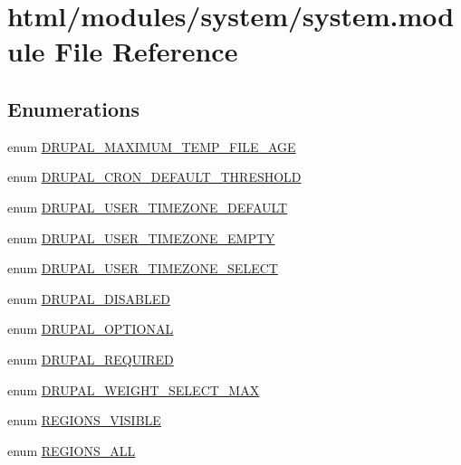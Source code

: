 \hypertarget{system_8module}{
\section{html/modules/system/system.module File Reference}
\label{system_8module}
}
\subsection*{Enumerations}
\begin{DoxyCompactItemize}
\item 
enum \hyperlink{system_8module_a48adbc5ce9391dacebddd91907dbbaaf}{DRUPAL\_\-MAXIMUM\_\-TEMP\_\-FILE\_\-AGE} 
\item 
enum \hyperlink{system_8module_a47326c184056858c75265eb78fea8eef}{DRUPAL\_\-CRON\_\-DEFAULT\_\-THRESHOLD} 
\item 
enum \hyperlink{system_8module_aabf97d0cd9173075e9d66e1acb2a6b7f}{DRUPAL\_\-USER\_\-TIMEZONE\_\-DEFAULT} 
\item 
enum \hyperlink{system_8module_a36f2231e8e443e860d5c67782a472542}{DRUPAL\_\-USER\_\-TIMEZONE\_\-EMPTY} 
\item 
enum \hyperlink{system_8module_a7df7638d437b7a705dfdb48f46b083e2}{DRUPAL\_\-USER\_\-TIMEZONE\_\-SELECT} 
\item 
enum \hyperlink{system_8module_a84956e394d850e59a82fbc78703795f1}{DRUPAL\_\-DISABLED} 
\item 
enum \hyperlink{system_8module_a1a7cc24228e990770cd55d79ba00e95e}{DRUPAL\_\-OPTIONAL} 
\item 
enum \hyperlink{system_8module_a0803ed1ab561db08e075e74427ecedd5}{DRUPAL\_\-REQUIRED} 
\item 
enum \hyperlink{system_8module_af60176176a88aa633d9c3240a8fcbc62}{DRUPAL\_\-WEIGHT\_\-SELECT\_\-MAX} 
\item 
enum \hyperlink{system_8module_a270017c2fcde2d42ea4e74defd32e195}{REGIONS\_\-VISIBLE} 
\item 
enum \hyperlink{system_8module_a39507d6bcc536ccdb523d962a7b8a5db}{REGIONS\_\-ALL} 
\end{DoxyCompactItemize}
